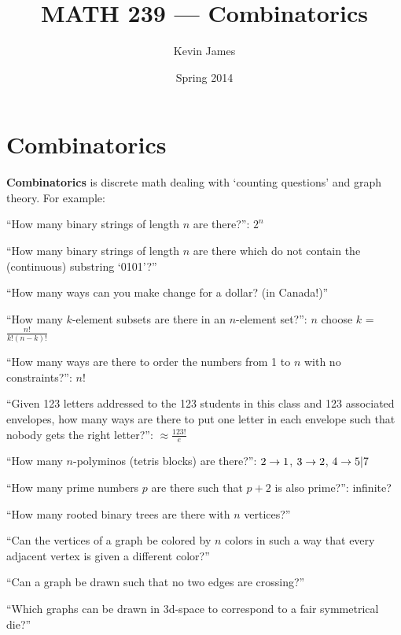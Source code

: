 \documentclass[12pt]{article}
\begin{document}
\title{MATH 239 --- Combinatorics}
\author{Kevin James}
\date{\vspace{-2ex}Spring 2014}
\maketitle\HRule

\section{Combinatorics}
{\bf Combinatorics} is discrete math dealing with `counting questions' and graph theory. For example:

``How many binary strings of length $n$ are there?'': $2^n$

``How many binary strings of length $n$ are there which do not contain the (continuous) substring `0101'?''

``How many ways can you make change for a dollar? (in Canada!)''

``How many $k$-element subsets are there in an $n$-element set?'': $n$ choose $k$ = $\frac{n!}{k!(n - k)!}$

``How many ways are there to order the numbers from 1 to $n$ with no constraints?'': $n!$

``Given 123 letters addressed to the 123 students in this class and 123 associated envelopes, how many ways are there to put one letter in each envelope such that nobody gets the right letter?'': $\approx \frac{123!}{e}$

``How many $n$-polyminos (tetris blocks) are there?'': $2 \rightarrow 1$, $3 \rightarrow 2$, $4 \rightarrow 5 | 7$

``How many prime numbers $p$ are there such that $p+2$ is also prime?'': infinite?

``How many rooted binary trees are there with $n$ vertices?''

``Can the vertices of a graph be colored by $n$ colors in such a way that every adjacent vertex is given a different color?''

``Can a graph be drawn such that no two edges are crossing?''

``Which graphs can be drawn in 3d-space to correspond to a fair symmetrical die?''
\end{document}
